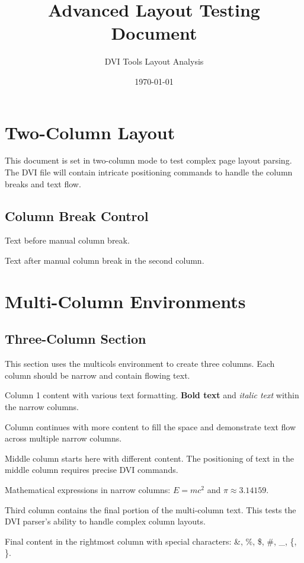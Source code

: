\documentclass[10pt,twocolumn]{article}
\title{Advanced Layout Testing Document}
\author{DVI Tools Layout Analysis}
\date{\today}
\begin{document}
\maketitle

\section{Two-Column Layout}

This document is set in two-column mode to test complex page layout parsing. The DVI file will contain intricate positioning commands to handle the column breaks and text flow.

\lipsum[1]

\subsection{Column Break Control}

Text before manual column break.

\columnbreak

Text after manual column break in the second column.

\lipsum[2]

\section{Multi-Column Environments}

\begin{multicols}{3}
\subsection{Three-Column Section}
This section uses the multicols environment to create three columns. Each column should be narrow and contain flowing text.

Column 1 content with various text formatting. \textbf{Bold text} and \textit{italic text} within the narrow columns.

Column continues with more content to fill the space and demonstrate text flow across multiple narrow columns.

\columnbreak

Middle column starts here with different content. The positioning of text in the middle column requires precise DVI commands.

Mathematical expressions in narrow columns: $E = mc^2$ and $\pi \approx 3.14159$.

\columnbreak

Third column contains the final portion of the multi-column text. This tests the DVI parser's ability to handle complex column layouts.

Final content in the rightmost column with special characters: \&, \%, \$, \#, \_, \{, \}.
\end{multicols}
\end{document}
